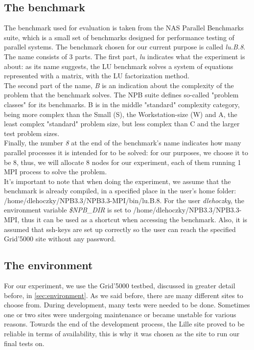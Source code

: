 \subsection{The benchmark}
The benchmark used for evaluation is taken from the NAS Parallel
Benchmarks suite\cite{jfy99}, which is a small set of benchmarks
designed for performance testing of parallel systems. The benchmark
chosen for our current purpose is called \emph{lu.B.8}. The name
consists of 3 parts. The first part, \emph{lu} indicates what the
experiment is about: as its name suggests, the LU benchmark solves a
system of equations represented with a matrix, with the LU
factorization method.\\
The second part of the name, \emph{B} is an
indication about the complexity of the problem that the benchmark
solves. The NPB suite defines so-called "problem classes" for its
benchmarks. B is in the middle "standard" complexity category, being
more complex than the Small (S), the Workstation-size (W) and A, the
least complex "standard" problem size, but less complex than C and the
larger test problem sizes.\cite{d13}\\
Finally, the number \emph{8} at the end of the benchmark's name
indicates how many parallel processes it is intended for to be solved:
for our purposes, we choose it to be 8, thus, we will allocate 8 nodes
for our experiment, each of them running 1 MPI process to solve the
problem.\\
It's important to note that when doing the experiment, we assume that
the benchmark is already compiled, in a specified place in the user's
home folder: /home/dlehoczky/NPB3.3/NPB3.3-MPI/bin/lu.B.8. For the
user \emph{dlehoczky}, the environment variable \emph{\$NPB\_DIR} is
set to /home/dlehoczky/NPB3.3/NPB3.3-MPI, thus it can be used as a
shortcut when accessing the benchmark. Also, it is assumed that
ssh-keys are set up correctly so the user can reach the specified
Grid'5000 site without any password.
\subsection{The environment}
For our experiment, we use the Grid'5000 testbed, discussed in greater
detail before, in \ref{sec:environment}. As we said before, there are
many different sites to choose from. During development,
many tests were needed to be done. Sometimes one or two sites were
undergoing maintenance or became unstable for various reasons. Towards
the end of the development process, the Lille site proved to be
reliable in terms of availability, this is why it was chosen as the
site to run our final tests on.
